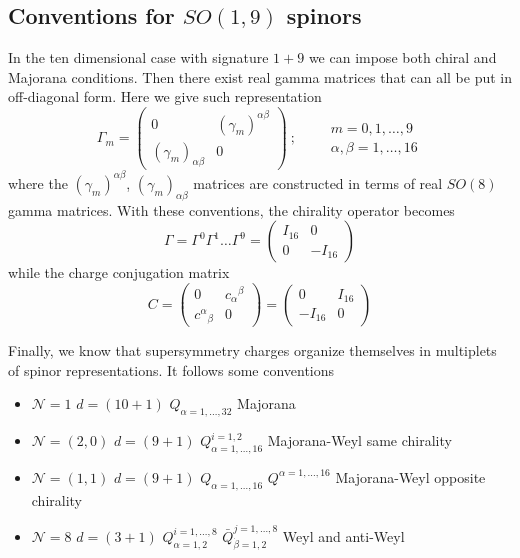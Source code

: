 \documentclass[a4paper,12pt]{article}
\numberwithin{equation}{section}
\numberwithin{thm}{section}
\numberwithin{exm}{section}
\newcommand{\<}{{\langle}}
\renewcommand{\>}{{\rangle}}
\newcommand{\mc}{\mathcal}
\renewcommand{\a}{{\alpha}}
\renewcommand{\b}{{\beta}}
\newcommand{\g}{{\gamma}}
\newcommand{\G}{{\Gamma}}
\begin{document}
\subsection{Conventions for $SO(1,9)$ spinors}
In the ten dimensional case with signature $1+9$ we can impose both chiral and Majorana conditions. Then there exist real gamma matrices that can all be put in off-diagonal form. Here we give such representation
	\begin{equation}
	\G_m = \left(
		\begin{array}{cc}
		0 & (\g_m)^{\a\b} \\
		(\g_m)_{\a\b} & 0
		\end{array}
	\right)\ ;\qquad
		\begin{aligned}
		m=0,1,\ldots,9 \\
		\a,\b = 1,\ldots,16
		\end{aligned}
	\end{equation}
where the $(\g_m)^{\a\b}$, $(\g_m)_{\a\b}$ matrices are constructed in terms of real $SO(8)$ gamma matrices. With these conventions, the chirality operator becomes
	\begin{equation}
	\G = \G^0 \G^1 \ldots \G^9 = \left(
		\begin{array}{cc}
		I_{16} & 0 \\
		0 & -I_{16}
		\end{array}
	\right)
	\end{equation}
while the charge conjugation matrix
	\begin{equation}
	C = \left(
		\begin{array}{cc}
		0 & c_\a{}^\b \\
		c^\a{}_\b & 0
		\end{array}
	\right) = \left(
		\begin{array}{cc}
		0 & I_{16} \\
		-I_{16} & 0
		\end{array}
	\right)
	\end{equation}

Finally, we know that supersymmetry charges organize themselves in multiplets of spinor representations. It follows some conventions
	\begin{itemize}
	\item $\mc N=1$ $d=(10+1)$ $Q_{\a=1,\ldots,32}$ Majorana
	\item $\mc N=(2,0)$ $d=(9+1)$ $Q^{i=1,2}_{\a = 1,\ldots,16}$ Majorana-Weyl same chirality
	\item $\mc N=(1,1)$ $d=(9+1)$ $Q_{\a=1,\ldots,16}$ $Q^{\a= 1,\ldots,16}$ Majorana-Weyl opposite chirality
	\item $\mc N=8$ $d=(3+1)$ $Q^{i=1,\ldots,8}_{\a=1,2}$ $\bar Q^{j=1,\ldots,8}_{\dot\b=1,2}$ Weyl and anti-Weyl
	\end{itemize}
\end{document}
